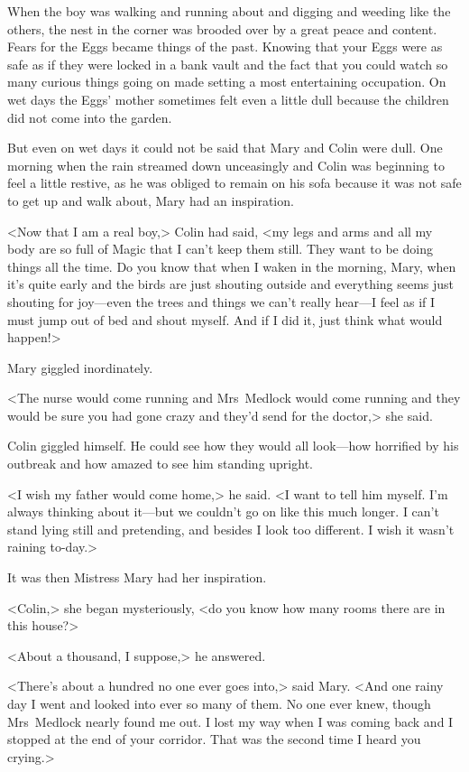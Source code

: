 When the boy was walking and running about and digging and weeding like the others, the nest in the corner was brooded over by a great peace and content. Fears for the Eggs became things of the past. Knowing that your Eggs were as safe as if they were locked in a bank vault and the fact that you could watch so many curious things going on made setting a most entertaining occupation. On wet days the Eggs' mother sometimes felt even a little dull because the children did not come into the garden.

But even on wet days it could not be said that Mary and Colin were dull. One morning when the rain streamed down unceasingly and Colin was beginning to feel a little restive, as he was obliged to remain on his sofa because it was not safe to get up and walk about, Mary had an inspiration.

<Now that I am a real boy,> Colin had said, <my legs and arms and all my body are so full of Magic that I can't keep them still. They want to be doing things all the time. Do you know that when I waken in the morning, Mary, when it's quite early and the birds are just shouting outside and everything seems just shouting for joy—even the trees and things we can't really hear—I feel as if I must jump out of bed and shout myself. And if I did it, just think what would happen!>

Mary giggled inordinately.

<The nurse would come running and Mrs~Medlock would come running and they would be sure you had gone crazy and they'd send for the doctor,> she said.

Colin giggled himself. He could see how they would all look—how horrified by his outbreak and how amazed to see him standing upright.

<I wish my father would come home,> he said. <I want to tell him myself. I'm always thinking about it—but we couldn't go on like this much longer. I can't stand lying still and pretending, and besides I look too different. I wish it wasn't raining to-day.>

It was then Mistress Mary had her inspiration.

<Colin,> she began mysteriously, <do you know how many rooms there are in this house?>

<About a thousand, I suppose,> he answered.

<There's about a hundred no one ever goes into,> said Mary. <And one rainy day I went and looked into ever so many of them. No one ever knew, though Mrs~Medlock nearly found me out. I lost my way when I was coming back and I stopped at the end of your corridor. That was the second time I heard you crying.>

